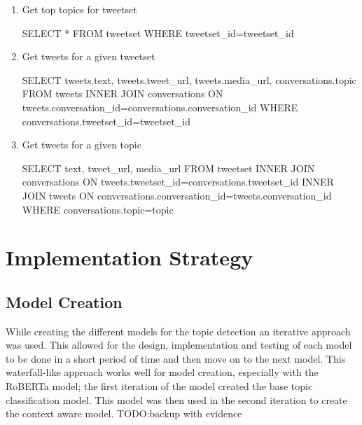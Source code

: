 \begin{enumerate}
\begin{algorithm}
\begin{algorithmic}
        \end{algorithmic}
    \end{algorithm}
    \item Get top topics for tweetset
    \begin{algorithm}
        \begin{algorithmic}
            \STATE SELECT * FROM tweetset WHERE tweetset\_id=tweetset\_id
        \end{algorithmic}
    \end{algorithm}
    \item Get tweets for a given tweetset
    \begin{algorithm}
        \begin{algorithmic}
            \STATE SELECT tweets.text, tweets.tweet\_url, tweets.media\_url, conversations.topic FROM tweets INNER JOIN conversations ON tweets.conversation\_id=conversations.conversation\_id WHERE conversations.tweetset\_id=tweetset\_id
        \end{algorithmic}
    \end{algorithm}
    \item Get tweets for a given topic
    \begin{algorithm}
        \begin{algorithmic}
            \STATE SELECT text, tweet\_url, media\_url FROM tweetset INNER JOIN conversations ON tweets.tweetset\_id=conversations.tweetset\_id INNER JOIN tweets ON conversations.conversation\_id=tweets.conversation\_id WHERE conversations.topic=topic
        \end{algorithmic}
    \end{algorithm}
\end{enumerate}
\section{Implementation Strategy}
\subsection{Model Creation}
While creating the different models for the topic detection an iterative approach was used. This allowed for the design, implementation and testing
of each model to be done in a short period of time and then move on to the next model. This waterfall-like approach works well for model creation,
especially with the RoBERTa model; the first iteration of the model created the base topic classification model. This model was then used
in the second iteration to create the context aware model.
TODO:backup with evidence
